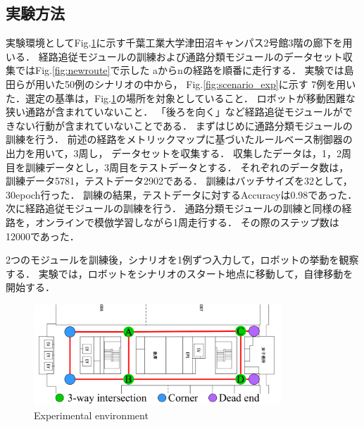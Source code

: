 \documentclass{sice-si}
\begin{document}
\subsection{実験方法}
実験環境としてFig.\ref{fig:cit3f}に示す千葉工業大学津田沼キャンパス2号館3階の廊下を用いる．
経路追従モジュールの訓練および通路分類モジュールのデータセット収集ではFig.\ref{fig:newroute}で示した
aからnの経路を順番に走行する．
実験では島田らが用いた50例のシナリオの中から，
Fig.\ref{fig:scenario_exp}に示す
7例を用いた．選定の基準は，Fig.\ref{fig:cit3f}の場所を対象としていること．
ロボットが移動困難な狭い通路が含まれていないこと．
「後ろを向く」など経路追従モジュールができない行動が含まれていないことである．
まずはじめに通路分類モジュールの訓練を行う．
前述の経路をメトリックマップに基づいたルールベース制御器の出力を用いて，3周し，
データセットを収集する．
収集したデータは，1，2周目を訓練データとし，3周目をテストデータとする．
それぞれのデータ数は，
訓練データ5781，テストデータ2902である．
訓練はバッチサイズを32として，30epoch行った．
訓練の結果，テストデータに対するAccuracyは0.98であった．
次に経路追従モジュールの訓練を行う．
通路分類モジュールの訓練と同様の経路を，オンラインで模倣学習しながら1周走行する．
その際のステップ数は12000であった．
\par
2つのモジュールを訓練後，シナリオを1例ずつ入力して，ロボットの挙動を観察する．
実験では，ロボットをシナリオのスタート地点に移動して，自律移動を開始する．
\begin{figure}[htbp]
    \centering
     \includegraphics[height=38mm]{./figs/cit3f.pdf}
     \caption{Experimental environment}\label{fig:cit3f}
\end{figure}
\end{document}
